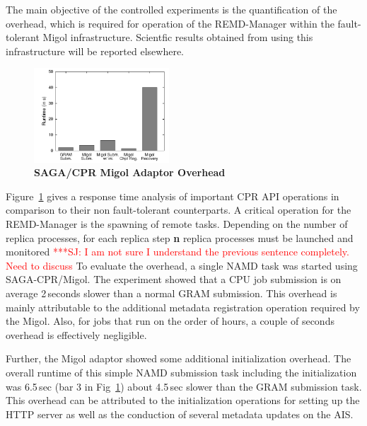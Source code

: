 \documentclass[times, 10pt, twocolumn]{article}
\newcommand{\jhanote}[1]{ {\textcolor{red} { ***SJ: #1 }}}
\newcommand{\jhanote}[1]{}
\newcommand{\up}{\vspace*{-1em}}
\begin{document}
  The main objective of the controlled experiments is the
  quantification of the overhead, which is required for operation of
  the REMD-Manager within the fault-tolerant Migol infrastructure.
  Scientfic results obtained from using this infrastructure will be 
  reported elsewhere.
\begin{figure}[ht]
    \centering
        \includegraphics[width=0.45\textwidth]{performance/perf_submission.pdf}
    \up
    \caption{\small \bf SAGA/CPR Migol Adaptor Overhead}
    
    \label{fig:performance_perf_submission}
\end{figure}           
Figure~\ref{fig:performance_perf_submission} gives a response time
analysis of important CPR API operations in comparison to their
non fault-tolerant counterparts. A critical operation for the
REMD-Manager is the spawning of remote tasks. Depending on the number
of replica processes, for each replica step {\bf n} replica processes
must be launched and monitored \jhanote{I am not sure I understand the
  previous sentence completely. Need to discuss} To evaluate the
overhead, a single NAMD task was started using SAGA-CPR/Migol.  The
experiment showed that a CPU job submission is on average 2\,seconds
slower than a normal GRAM submission. This overhead is mainly
attributable to the additional metadata registration operation
required by the Migol. Also, for jobs that run on the order of hours,
a couple of seconds overhead is effectively negligible.

Further, the Migol adaptor showed some additional initialization
overhead.  The overall runtime of this simple NAMD submission task
including the initialization was 6.5\,sec (bar 3 in
Fig~\ref{fig:performance_perf_submission}) about 4.5\,sec slower
than the GRAM submission task. This overhead can be attributed to the
initialization operations for setting up the HTTP server as well as
the conduction of several metadata updates on the AIS.
                                                                                                                    
\end{document}
